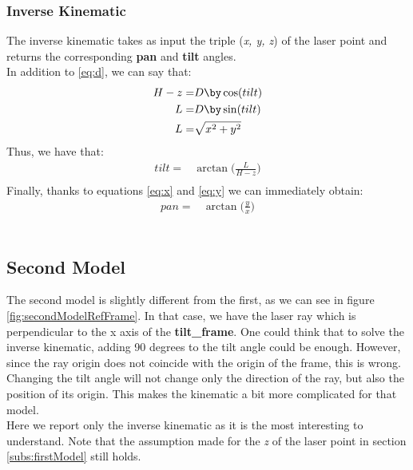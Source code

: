 \subsubsection{Inverse Kinematic}
The inverse kinematic takes as input the triple (\textit{x, y, z}) of the laser point and returns the corresponding \textbf{pan} and \textbf{tilt} angles.\\
In addition to \ref{eq:d}, we can say that:
\begin{align}
    H-z =& D\by\cos(tilt)\\
	L =& D\by\sin(tilt) \label{eq:dsin}\\
	L=& \sqrt{x^2+y^2}
\end{align}
Thus, we have that:
\begin{align}
    tilt =& \arctan\bigg(\frac{L}{H-z}\bigg) \label{eq:tiltik}\\
\end{align}
Finally, thanks to equations \ref{eq:x} and \ref{eq:y} we can immediately obtain:
\begin{align}
	pan=& \arctan\bigg(\frac{y}{x}\bigg)\label{eq:panik}
\end{align}
\\
\subsection{Second Model}
The second model is slightly different from the first, as we can see in figure \ref{fig:secondModelRefFrame}. In that case, we have the laser ray which is perpendicular to the x axis of the \textbf{tilt\_frame}. One could think that to solve the inverse kinematic, adding 90 degrees to the tilt angle could be enough. However, since the ray origin does not coincide with the origin of the frame, this is wrong. Changing the tilt angle will not change only the direction of the ray, but also the position of its origin. This makes the kinematic a bit more complicated for that model.
\\
Here we report only the inverse kinematic as it is the most interesting to understand. Note that the assumption made for the \textit{z} of the laser point in section \ref{subs:firstModel} still holds.


